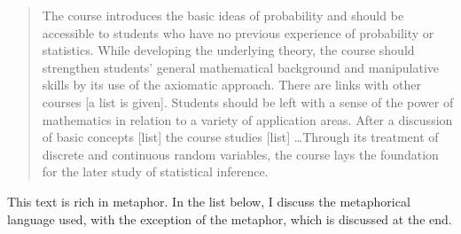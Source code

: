 \begin{singlespace}
\begin{quote}
The course introduces the basic ideas of probability and should be
accessible to students who have no previous experience of probability
or statistics.  While developing the underlying theory, the course
should strengthen students' general mathematical background and
manipulative skills by its use of the axiomatic approach.  There are
links with other courses [a list is given].  Students should be left
with a sense of the power of mathematics in relation to a variety of
application areas.  After a discussion of basic concepts [list] the
course studies [list] \ldots Through its treatment of discrete and
continuous random variables, the course lays the foundation for the
later study of statistical inference.
\end{quote}
\end{singlespace}

\noindent
This text is rich in metaphor.   In the list below, I discuss the
metaphorical language used, with the exception of the
 metaphor, which is discussed at the end.

